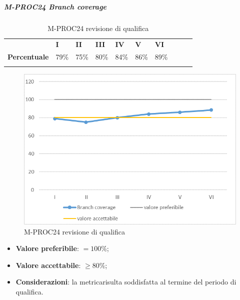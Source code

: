 \subparagraph{M-PROC24 Branch coverage} \mbox{}
\begin{longtable}[H!] {						
		>{}p{35mm}  		
		>{}p{12mm}
		>{}p{12mm}		
		>{}p{12mm}		
		>{}p{12mm}		
		>{}p{12mm}		
		>{}p{12mm}
		>{}p{12mm}
		>{}p{12mm}
		>{}p{12mm}
	}
	\rowcolor{gray!50}
	\textbf{} & \textbf{I} & \textbf{II} & \textbf{III} & \textbf{IV} & \textbf{V} & \textbf{VI} \TBstrut \\ [2mm]
	\textbf{Percentuale} & 79\% & 75\% & 80\% & 84\% & 86\% & 89\% \TBstrut \\ [2mm]
	\rowcolor{white}
	\caption{M-PROC24 revisione di qualifica}
\end{longtable}
\begin{figure}[H] 	
	\includegraphics[width=\linewidth]{./img/grafici/RQ24.png}	
	\caption{M-PROC24 revisione di qualifica}	
\end{figure}
\begin{itemize}
	\item \textbf{Valore preferibile}: $=100\%$;
	\item \textbf{Valore accettabile}: $\ge 80\%$;
	\item \textbf{Considerazioni}: la metrica\glosp risulta soddisfatta al termine del periodo di qualifica.
\end{itemize}

